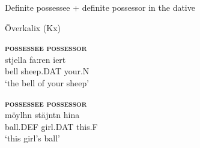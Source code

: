 
\item 

Definite possessee + definite possessor in the dative



\item 

Överkalix (Kx)



\item 


 \ea\label{}
\gll \textbf{\textsc{possessee}}  \textbf{\textsc{possessor}}\\

 \ea\label{}
\gll stjella  fa:ren  iert\\


bell  sheep.DAT  your.N\\

\glt ‘the bell of your sheep’

\z

\item 


 \ea\label{}
\gll \textbf{\textsc{possessee}}  \textbf{\textsc{possessor}}\\

 \ea\label{}
\gll möylhn  stäjntn  hina\\


ball.DEF  girl.DAT  this.F\\

\glt ‘this girl’s ball’

